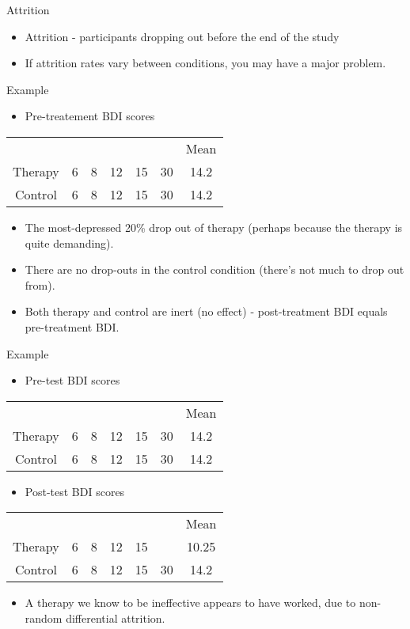 \documentclass{beamer}
\begin{document}
\begin{frame}{Attrition}
\begin{itemize}
\item Attrition - participants dropping out before the end of the study
\item If attrition rates vary between conditions, you may have a major problem.
\end{itemize}
\end{frame}

\begin{frame}{Example}
\begin{itemize}
\item Pre-treatement BDI scores
\end{itemize}
\begin{tabular} {c c c c c c c}
 &  &  &  &  &  & Mean \\
Therapy	& 6 & 8	& 12 & 15 & 30 & 14.2 \\
Control	& 6 & 8	& 12 & 15 & 30 & 14.2 \\
\end{tabular} 
\vspace{12 pt}
\begin{itemize}
\item The most-depressed 20\% drop out of therapy (perhaps because the therapy is quite demanding).
\item There are no drop-outs in the control condition (there's not much to drop out from).
\item Both therapy and control are inert (no effect) - post-treatment BDI equals pre-treatment BDI.
\end{itemize}
\end{frame}

\begin{frame}{Example}
\begin{itemize}
\item Pre-test BDI scores
\end{itemize}
\begin{tabular} {c c c c c c c}
 &  &  &  &  &  & Mean \\
Therapy	& 6 & 8	& 12 & 15 & 30 & 14.2 \\
Control	& 6 & 8	& 12 & 15 & 30 & 14.2 \\
\end{tabular} 
\begin{itemize}
\item Post-test BDI scores
\end{itemize}
\begin{tabular} {c c c c c c c}
 &  &  &  &  &  & Mean \\
Therapy	& 6 & 8	& 12 & 15 &  & 10.25 \\
Control	& 6 & 8	& 12 & 15 & 30 & 14.2 \\
\end{tabular} 

\vspace{12 pt}
\begin{itemize}
\item A therapy we know to be ineffective appears to have worked, due to non-random differential attrition.
\end{itemize}
\end{frame}
\end{document}
